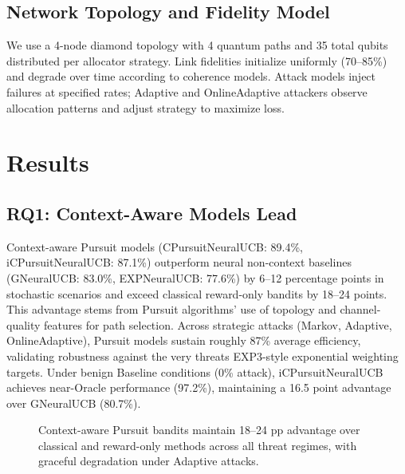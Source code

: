 \documentclass[10pt,twocolumn,journal]{IEEEtran}
\begin{document}
\subsection{Network Topology and Fidelity Model}

We use a 4-node diamond topology with 4 quantum paths and 35 total qubits distributed per allocator strategy. Link fidelities initialize uniformly (70--85\%) and degrade over time according to coherence models. Attack models inject failures at specified rates; Adaptive and OnlineAdaptive attackers observe allocation patterns and adjust strategy to maximize loss.

\section{Results}
\label{sec:results}

\subsection{RQ1: Context-Aware Models Lead}

Context-aware Pursuit models (CPursuitNeuralUCB: 89.4\%, iCPursuitNeuralUCB: 87.1\%) outperform neural non-context baselines (GNeuralUCB: 83.0\%, EXPNeuralUCB: 77.6\%) by 6--12 percentage points in stochastic scenarios and exceed classical reward-only bandits by 18--24 points. This advantage stems from Pursuit algorithms' use of topology and channel-quality features for path selection. Across strategic attacks (Markov, Adaptive, OnlineAdaptive), Pursuit models sustain roughly 87\% average efficiency, validating robustness against the very threats EXP3-style exponential weighting targets. Under benign Baseline conditions (0\% attack), iCPursuitNeuralUCB achieves near-Oracle performance (97.2\%), maintaining a 16.5 point advantage over GNeuralUCB (80.7\%).

\begin{figure}[t]
\centering
{}
\caption{Context-aware Pursuit bandits maintain 18--24 pp advantage over classical and reward-only methods across all threat regimes, with graceful degradation under Adaptive attacks.}
\label{fig:context_comparison}
\end{figure}
\end{document}
